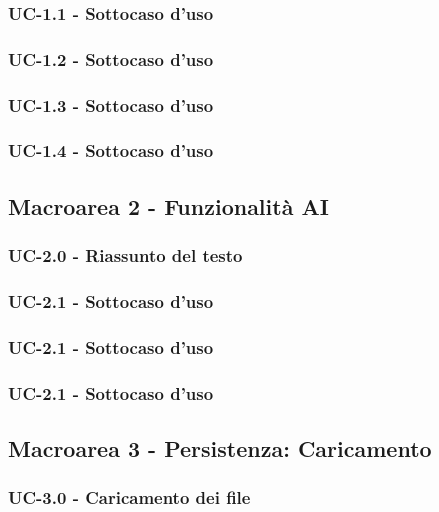 \documentclass[11pt,a4paper]{article}
\begin{document}
\subsubsection{UC-1.1 - Sottocaso d'uso}

\subsubsection{UC-1.2 - Sottocaso d'uso}

\subsubsection{UC-1.3 - Sottocaso d'uso}

\subsubsection{UC-1.4 - Sottocaso d'uso}




\subsection{Macroarea 2 - Funzionalità AI}
\subsubsection{UC-2.0 - Riassunto del testo}

\subsubsection{UC-2.1 - Sottocaso d'uso}

\subsubsection{UC-2.1 - Sottocaso d'uso}

\subsubsection{UC-2.1 - Sottocaso d'uso}




\subsection{Macroarea 3 - Persistenza: Caricamento}
\subsubsection{UC-3.0 - Caricamento dei file}
\end{document}

